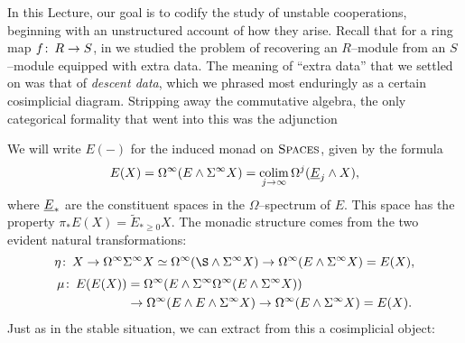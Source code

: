In this Lecture, our goal is to codify the study of unstable cooperations, beginning with an unstructured account of how they arise.  Recall that for a ring map \(f\colon\thinspace R \to S\), in  we studied the problem of recovering an \(R\)--module from an \(S\)--module equipped with extra data.  The meaning of ``extra data'' that we settled on was that of \textit{descent data}, which we phrased most enduringly as a certain cosimplicial diagram.  Stripping away the commutative algebra, the only categorical formality that went into this was the adjunction
\begin{center}
\end{center}
We will write \(E(-)\) for the induced monad on \(\normalfont\textsc{Spaces}\), given by the formula \[E(X) = \Loops^\infty (E \sm \Susp^\infty X) = \colim_{j \to \infty} \Loops^j (\OS{E}{j} \sm X),\] where \(\OS{E}{*}\) are the constituent spaces in the \(\Omega\)--spectrum of \(E\).  This space has the property \(\pi_* E(X) = \widetilde E_{* \ge 0} X\).  The monadic structure comes from the two evident natural transformations:
\[\eta\co X \to \Loops^\infty \Susp^\infty X \simeq \Loops^\infty (\S \sm \Susp^\infty X) \to \Loops^\infty (E \sm \Susp^\infty X) = E(X),\] \vspace{-1.6\baselineskip}
\begin{align*}
\mu\colon\thinspace E(E(X)) & = \Omega^\infty(E \wedge \Sigma^\infty\Omega^\infty(E \wedge \Sigma^\infty X)) \\
& \to \Omega^\infty(E \wedge E \wedge \Sigma^\infty X) \to \Omega^\infty(E \wedge \Sigma^\infty X) = E(X).
\end{align*}
Just as in the stable situation, we can extract from this a cosimplicial object:


